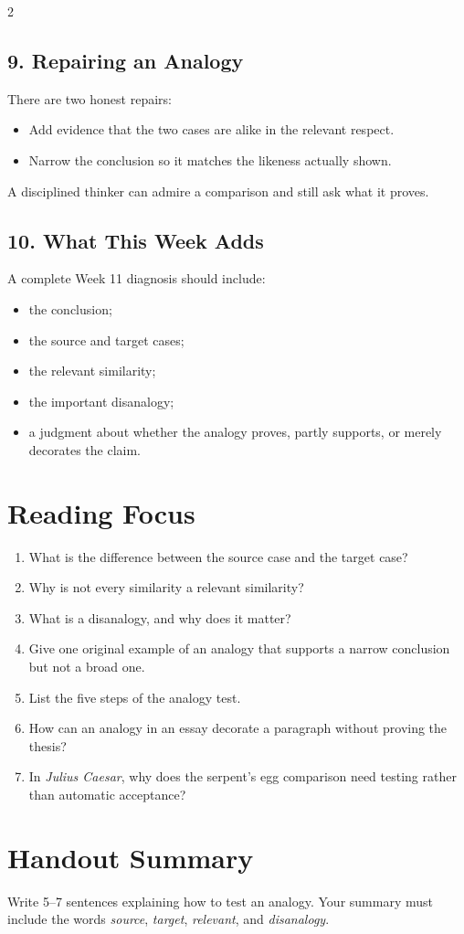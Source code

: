\documentclass[12pt]{article}
\begin{document}
\begin{multicols}{2}
\subsection*{9. Repairing an Analogy}
There are two honest repairs:
\begin{itemize}[leftmargin=*]
\item Add evidence that the two cases are alike in the relevant respect.
\item Narrow the conclusion so it matches the likeness actually shown.
\end{itemize}
A disciplined thinker can admire a comparison and still ask what it proves.

\subsection*{10. What This Week Adds}
A complete Week 11 diagnosis should include:
\begin{itemize}[leftmargin=*,itemsep=0.12em]
\item the conclusion;
\item the source and target cases;
\item the relevant similarity;
\item the important disanalogy;
\item a judgment about whether the analogy proves, partly supports, or merely decorates the claim.
\end{itemize}

\section*{Reading Focus}
\begin{enumerate}[leftmargin=*]
\item What is the difference between the source case and the target case?
\item Why is not every similarity a relevant similarity?
\item What is a disanalogy, and why does it matter?
\item Give one original example of an analogy that supports a narrow conclusion but not a broad one.
\item List the five steps of the analogy test.
\item How can an analogy in an essay decorate a paragraph without proving the thesis?
\item In \textit{Julius Caesar}, why does the serpent's egg comparison need testing rather than automatic acceptance?
\end{enumerate}

\section*{Handout Summary}
Write 5--7 sentences explaining how to test an analogy. Your summary must include the words \textit{source}, \textit{target}, \textit{relevant}, and \textit{disanalogy}.
\end{multicols}
\end{document}
